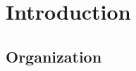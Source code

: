 \chapter{Introduction}
\label{chap:introduction}



	\section{Organization}
	\label{sec:organization}
	